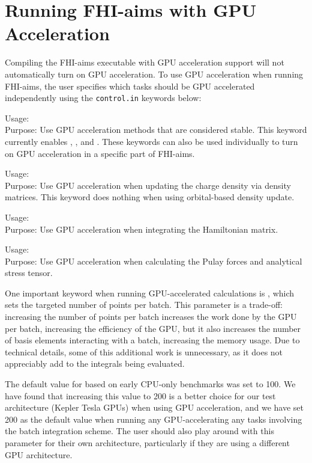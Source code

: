 \section{Running FHI-aims with GPU Acceleration}
Compiling the FHI-aims executable with GPU acceleration support will not automatically turn on GPU acceleration. To use GPU acceleration when running FHI-aims, the user specifies which tasks should be GPU accelerated independently using the \texttt{control.in} keywords below:

{
  \noindent
  Usage:  \\[1.0ex]
  Purpose: Use GPU acceleration methods that are considered stable. This keyword currently enables , , and . These keywords can also be used individually to turn on GPU acceleration in a specific part of FHI-aims.
}

{
  \noindent
  Usage:  \\[1.0ex]
  Purpose: Use GPU acceleration when updating the charge density via density matrices. This keyword does nothing when using orbital-based density update. \\[1.0ex]
}

{
  \noindent
  Usage:  \\[1.0ex]
  Purpose: Use GPU acceleration when integrating the Hamiltonian matrix. \\[1.0ex]
}

{
  \noindent
  Usage:  \\[1.0ex]
  Purpose: Use GPU acceleration when calculating the Pulay forces and analytical stress tensor. \\[1.0ex]
}

One important keyword when running GPU-accelerated calculations is , which sets the targeted number of points per batch. This parameter is a trade-off: increasing the number of points per batch increases the work done by the GPU per batch, increasing the efficiency of the GPU, but it also increases the number of basis elements interacting with a batch, increasing the memory usage. Due to technical details, some of this additional work is unnecessary, as it does not appreciably add to the integrals being evaluated.

The default value for  based on early CPU-only benchmarks was set to 100. We have found that increasing this value to 200 is a better choice for our test architecture (Kepler Tesla GPUs) when using GPU acceleration, and we have set 200 as the default value when running any GPU-accelerating any tasks involving the batch integration scheme. The user should also play around with this parameter for their own architecture, particularly if they are using a different GPU architecture.

